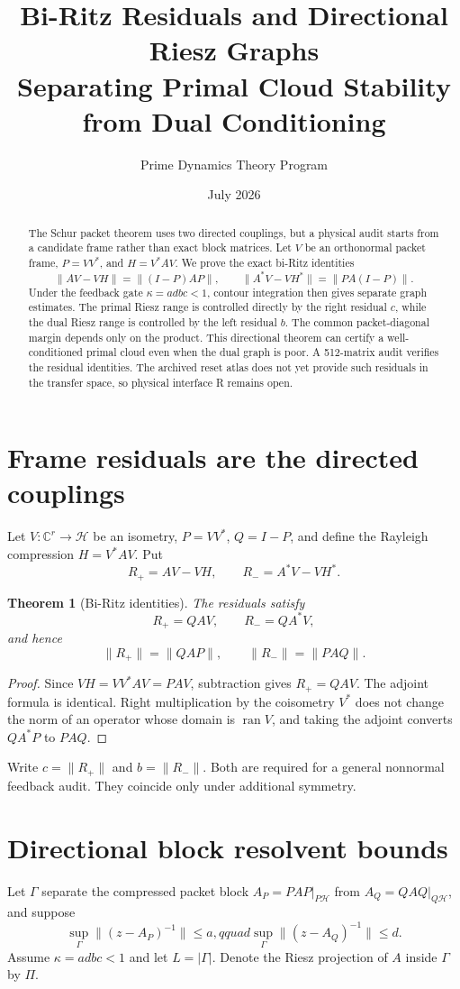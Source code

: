 \documentclass[12pt]{article}
\title{Bi-Ritz Residuals and Directional Riesz Graphs\\\large Separating Primal Cloud Stability from Dual Conditioning}
\author{Prime Dynamics Theory Program}
\date{July 2026}
\newtheorem{theorem}{Theorem}
\newcommand{\norm}[1]{\lVert#1\rVert}
\begin{document}
\maketitle
\begin{abstract}
The Schur packet theorem uses two directed couplings, but a physical audit
starts from a candidate frame rather than exact block matrices.  Let $V$ be
an orthonormal packet frame, $P=VV^*$, and $H=V^*AV$.  We prove the exact
bi-Ritz identities
\[
 \norm{AV-VH}=\norm{(I-P)AP},\qquad
 \norm{A^*V-VH^*}=\norm{PA(I-P)}.
\]
Under the feedback gate $\kappa=adbc<1$, contour integration then gives
separate graph estimates.  The primal Riesz range is controlled directly by
the right residual $c$, while the dual Riesz range is controlled by the left
residual $b$.  The common packet-diagonal margin depends only on the product.
This directional theorem can certify a well-conditioned primal cloud even
when the dual graph is poor.  A 512-matrix audit verifies the residual
identities.  The archived reset atlas does not yet provide such residuals in
the transfer space, so physical interface R remains open.
\end{abstract}

\section{Frame residuals are the directed couplings}
Let $V:\mathbb C^r\to\mathcal H$ be an isometry, $P=VV^*$, $Q=I-P$, and
define the Rayleigh compression $H=V^*AV$.  Put
\[
 R_+=AV-VH,\qquad R_-=A^*V-VH^*.
\]

\begin{theorem}[Bi-Ritz identities]\label{thm:ritz}
The residuals satisfy
\[
 R_+=QAV,\qquad R_-=QA^*V,
\]
and hence
\[
 \norm{R_+}=\norm{QAP},\qquad
 \norm{R_-}=\norm{PAQ}.
\]
\end{theorem}
\begin{proof}
Since $VH=VV^*AV=PAV$, subtraction gives $R_+=QAV$.  The adjoint formula is
identical.  Right multiplication by the coisometry $V^*$ does not change the
norm of an operator whose domain is $\operatorname{ran}V$, and taking the
adjoint converts $QA^*P$ to $PAQ$.
\end{proof}

Write $c=\norm{R_+}$ and $b=\norm{R_-}$.  Both are required for a general
nonnormal feedback audit.  They coincide only under additional symmetry.

\section{Directional block resolvent bounds}
Let $\Gamma$ separate the compressed packet block $A_P=PAP|_{P\mathcal H}$
from $A_Q=QAQ|_{Q\mathcal H}$, and suppose
\[
 \sup_\Gamma\norm{(z-A_P)^{-1}}\le a,qquad
 \sup_\Gamma\norm{(z-A_Q)^{-1}}\le d.
\]
Assume $\kappa=adbc<1$ and let $L=|\Gamma|$.  Denote the Riesz projection of
$A$ inside $\Gamma$ by $\Pi$.
\end{document}
